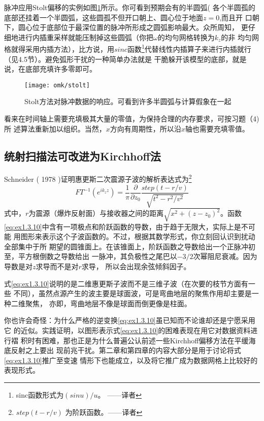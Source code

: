 脉冲应用Stolt偏移的实例如图\ref{fig:omk/stolt}所示。你可看到预期会有的半圆弧(
各个半圆孤的底部还挂着一个半圆弧，这些圆孤不但开口朝上、圆心位于地面$z=0$,而且开
口朝下，圆心位于底部位于最深位置的脉冲所形成之圆弧影响最大。众所周知，
更仔细地进行内插重采样就能压制掉这些圆弧（你把$\omega$的均勻网格转换为$k_z$的非
均匀网格就得采用内插方法），比方说，用$sinc$函数\footnote{sinc函数形式为$(sin u)/u$。
——译者}代替线性内插算子来进行内插就行（见4.5节）。避免弧形干扰的一种简单办法就是
干脆躲开该模型的底部，就是说，在底部充填许多零即可。
\begin{figure}[H]
\centering
\texttt{[image: omk/stolt]}
\caption[stolt]{Stolt方法对脉冲数据的响应。可看到许多半圆弧与计算假象在一起}
\label{fig:omk/stolt}
\end{figure}
看来在时间轴上需要充填极其大量的零值，为保持合理的内存要求，可按习题（4)所
述算法重新加以组织。当然，$x$方向有周期性，所以沿$x$轴也需要充填零值。

\subsection{统射扫描法可改进为Kirchhoff法}
\label{sec:1.3.7}

Schneider ( 1978 )证明惠更斯二次震源子波的解析表达式为\footnote{$step(t-r/v)$
为阶跃函数。——译者}
\begin{equation}
FT^{-1}(e^{ik_zz})=\frac{1}{\pi}\frac{\partial}{\partial z_0}\frac{step(t-r/v)}{\sqrt{t^2-r^2/v^2}}
\label{eq:ex1.3.10}
\end{equation}
式中，$r$为震源（爆炸反射面）与接收器之间的距离$\sqrt{x^2+(z-z_0)^2}$。函数
\ref{eq:ex1.3.10}中含有一项极点和阶跃函数的导数，由于趋于无限大，实际上是不可能
用图形来表示这个子波函数的。不过，根据其数学形式，你立刻回认识到扰动全部集中于所
期望的圆锥面上。在该锥面上，阶跃函数之导数给出一个正脉冲初至，平方根倒数之导数给出
一脉冲，其负极性之尾巴以$-3/2$次幂阻尼衰减。因为导数是对$z$求导而不是对$r$求导，
所以会出现余弦倾斜因子。

式\ref{eq:ex1.3.10}说明的是二维惠更斯子波而不是三维子波（在次要的枝节方面有一些
不同），虽然点源产生的波主要是球面波，可是弯曲地层的聚焦作用却主要是一种二维聚焦，
亦即，弯曲地层不像是球面而倒更像是柱面。

你也许会奇怪：为什么严格的逆变换\ref{eq:ex1.3.10}虽已知而不论谁却还是宁愿采用它
的近似。实践证明，以图形表示式\ref{eq:ex1.3.10}的困难表现在用它对数据资料进行褶
积时有困难，那也正是为什么普遍公认前述一些Kirchhoff偏移方法在平缓海底反射之上要出
现前兆干扰。第二章和第四章的内容大部分是用于讨论将式\ref{eq:ex1.3.10}推广至变速
情形下也能成立，以及将它推广成为数据网格上比较好的表现形式。

